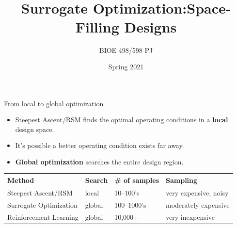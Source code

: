 \documentclass[
  9pt,
  ignorenonframetext,
]{beamer}
\title{Surrogate Optimization:\newline Space-Filling Designs}
\author{BIOE 498/598 PJ}
\date{Spring 2021}
\providecommand{\tightlist}{%
  \setlength{\itemsep}{0pt}\setlength{\parskip}{0pt}}
\begin{document}
\frame{\titlepage}

\begin{frame}{From local to global optimization}
\protect\hypertarget{from-local-to-global-optimization}{}
\begin{itemize}
\tightlist
\item
  Steepest Ascent/RSM finds the optimal operating conditions in a
  \textbf{local} design space.
\item
  It's possible a better operating condition exists far away.
\item
  \textbf{Global optimization} searches the entire design region.
\end{itemize}

\bigskip
\pause
\begin{center}
  \begin{tabular}{llll}
    \toprule
    \textbf{Method} & \textbf{Search} & \textbf{\# of samples} & \textbf{Sampling} \\
    \midrule
    Steepest Ascent/RSM & local & 10--100's & very expensive, noisy \\
    Surrogate Optimization & global & 100--1000's & moderately expensive \\
    Reinforcement Learning & global & 10,000$+$ & very inexpensive \\
    \bottomrule
  \end{tabular}
\end{center}
\end{frame}
\end{document}
